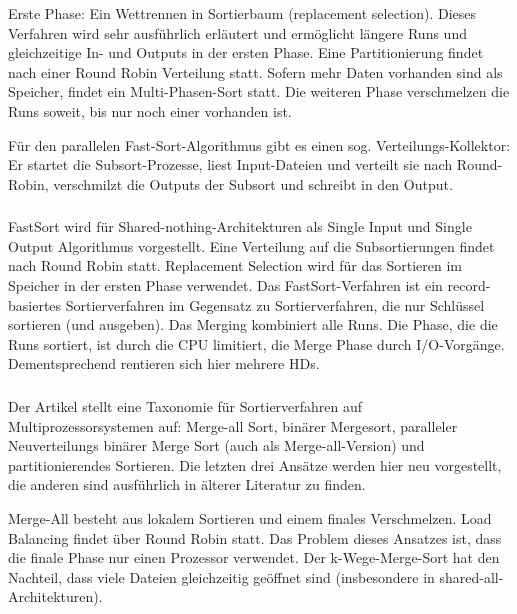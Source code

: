\documentclass[a4paper,12pt,twoside]{article}
\begin{document}
Erste Phase: Ein Wettrennen in Sortierbaum (replacement selection). Dieses Verfahren wird sehr ausführlich erläutert und ermöglicht längere Runs und gleichzeitige In- und Outputs in der ersten Phase. Eine Partitionierung findet nach einer Round Robin Verteilung statt.
Sofern mehr Daten vorhanden sind als Speicher, findet ein Multi-Phasen-Sort statt. Die weiteren Phase verschmelzen die Runs soweit, bis nur noch einer vorhanden ist.

Für den parallelen Fast-Sort-Algorithmus gibt es einen sog. Verteilungs-Kollektor: Er startet die Subsort-Prozesse, liest Input-Dateien und verteilt sie nach Round-Robin, verschmilzt die Outputs der Subsort und schreibt in den Output.

\subsubsection*{}

FastSort wird für Shared-nothing-Architekturen als Single Input und Single Output Algorithmus  vorgestellt. Eine Verteilung auf die Subsortierungen findet nach Round Robin statt. Replacement Selection wird für das Sortieren im Speicher in der ersten Phase verwendet. Das FastSort-Verfahren ist ein record-basiertes Sortierverfahren im Gegensatz zu Sortierverfahren, die nur Schlüssel sortieren (und ausgeben). Das Merging kombiniert alle Runs. Die Phase, die die Runs sortiert, ist durch die CPU limitiert, die Merge Phase durch I/O-Vorgänge. Dementsprechend rentieren sich hier mehrere HDs. 

\subsubsection*{}

Der Artikel stellt eine Taxonomie für Sortierverfahren auf Multiprozessorsystemen auf: Merge-all Sort, binärer Mergesort, paralleler Neuverteilungs binärer Merge Sort (auch als Merge-all-Version) und partitionierendes Sortieren. Die letzten drei Ansätze werden hier neu vorgestellt, die anderen sind ausführlich in älterer Literatur zu finden.

Merge-All besteht aus lokalem Sortieren und einem finales Verschmelzen. Load Balancing findet über Round Robin statt. Das Problem dieses Ansatzes ist, dass die finale Phase nur einen Prozessor verwendet. Der k-Wege-Merge-Sort hat den Nachteil, dass viele Dateien gleichzeitig geöffnet sind (insbesondere in shared-all-Architekturen).
\end{document}
